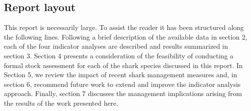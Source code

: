 \documentclass[12pt]{SCreport}
\begin{document}
\begin{comment}
Sharks are typically caught as bycatch in the Pacific tuna fisheries, though some directed and/or mixed species fisheries also exist. The status of the shark species designated as key shark species (blue, mako, thresher, silky and oceanic white tip sharks) in the western and central Pacific Ocean (WCPO) \hl{ADD REF} underwent a comprehensive review in 2011 \citep{Clarke2011_a}. Drawing on \citep{...}, this review presented a number of indicators to inform on the status of the stock of these shark species and their response to fishing pressure. Given the paucity of data availability for shark species compared to target species, these indicators were developed around the type of information typically available from operational-level data for industrial purse-seine and longline fleets. 

The current study updates key indicators and extends the analyses to include hammerhead, porbeagle and whale sharks. We present information on the geographic range of catches for each of the species considered; temporal trends in catch composition and catch rates, and key biological indicators of fishing pressure such as mean size and sex ratio by species. Whale sharks are assessed separately due to the unique nature of their interactions with fisheries in the WCPO. The analyses are based on Secretariat of the Pacific Community - Oceanic Fisheries Programme (SPC-OFP) data holdings for sharks taken in longline and purse seine fisheries in the Western and Central Pacific Ocean (WCPO). The framework for the analysis is a series of indicators of fishing pressure and stock status that were first described in the Shark Research Plan presented to the sixth meeting of the Western and Central Pacific Fisheries Commission's (WCPFC) Scientific Committee (SC6; Clarke and Harley 2010). A preliminary indicator-based analysis of SPC data holdings was presented to the Commission in December 2010 (Clarke et al. 2010) with an exhaustive review of the fisheries and data sources presented to SC7 (Clarke et al. 2011). \hlcoral{end of this paragraph repeats first paragraph, need to merge}
\end{comment}

\subsection{Report layout}
This report is necessarily large. To assist the reader it has been structured along the following lines. Following a brief description of the available data in section 2, each of the four indicator analyses are described and results summarized in section 3. Section 4 presents a consideration of the feasibility of conducting a formal stock assessment for each of the shark species discussed in this report.  In Section 5, we review the impact of recent shark management measures and, in section 6, recommend future work to extend and improve the indicator analysis approach.  Finally, section 7 discusses the management implications arising from the results of the work presented here.
\end{document}
